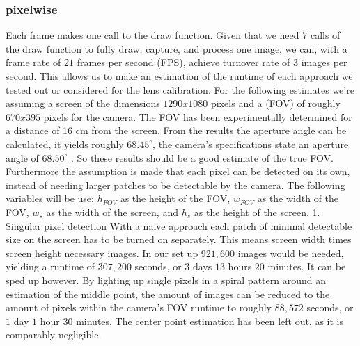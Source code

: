 \documentclass[journal,final,a4paper,twoside]{PS}
\begin{document}
\subsubsection{pixelwise}
\label{sec:pixelwise}
Each frame makes one call to the draw function. Given that we need $7$ calls of the draw function to fully draw, capture, and process one image, we can, with a frame rate of $21$ frames per second (FPS), achieve turnover rate of $3$ images per second. This allows us to make an estimation of the runtime of each approach we tested out or considered for the lens calibration. For the following estimates we're assuming a screen of the dimensions $1290 x 1080$ pixels and a (FOV) of roughly $670 x 395$ pixels for the camera. The FOV has been experimentally determined for a distance of 16 cm from the screen. From the results the aperture angle can be calculated, it yields roughly $68.45^{\circ}$, the camera’s specifications state an aperture angle of $68.50 ^{\circ}$ . So these results should be a good estimate of the true FOV. Furthermore the assumption is made that each pixel can be detected on its own, instead of needing larger patches to be detectable by the camera.
The following variables will be use: $h_{FOV}$ as the height of the FOV, $w_{FOV}$ as the width of the FOV, $w_s$ as the width of the screen, and $h_s$ as the height of the screen.
1. Singular pixel detection
With a naive approach each patch of minimal detectable size on the screen has to be turned on separately. This means screen width times screen height necessary images. In our set up $921,600$ images would be needed, yielding a runtime of $307,200$ seconds, or $3$ days $13$ hours $20$ minutes.
It can be sped up however. By lighting up single pixels in a spiral pattern around an estimation of the middle point, the amount of images can be reduced to the amount of pixels within the camera’s FOV runtime to roughly $88,572$ seconds, or $1$ day $1$ hour $30$ minutes.
The center point estimation has been left out, as it is comparably negligible.\\
	
\end{document}
